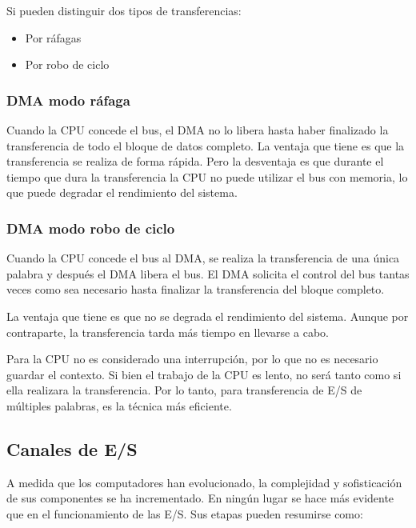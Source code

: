 Si pueden distinguir dos tipos de transferencias:

\begin{itemize}
  \item Por ráfagas
  \item Por robo de ciclo
\end{itemize}

\begin{subs}
  \subsubsection{DMA modo ráfaga}

  Cuando la CPU concede el bus, el DMA no lo libera hasta haber finalizado la transferencia de todo el bloque de datos completo. La ventaja que tiene es que la transferencia se realiza de forma rápida. Pero la desventaja es que durante el tiempo que dura la transferencia la CPU no puede utilizar el bus con memoria, lo que puede degradar el rendimiento del sistema.

  \subsubsection{DMA modo robo de ciclo}

  Cuando la CPU concede el bus al DMA, se realiza la transferencia de una única palabra y después el DMA libera el bus. El DMA solicita el control del bus tantas veces como sea necesario hasta finalizar la transferencia del bloque completo.

  La ventaja que tiene es que no se degrada el rendimiento del sistema. Aunque por contraparte, la transferencia tarda más tiempo en llevarse a cabo.

  Para la CPU no es considerado una interrupción, por lo que no es necesario guardar el contexto. Si bien el trabajo de la CPU es lento, no será tanto como si ella realizara la transferencia. Por lo tanto, para transferencia de E/S de múltiples palabras, es la técnica más eficiente.

\end{subs}

\subsection{Canales de E/S}

A medida que los computadores han evolucionado, la complejidad y sofisticación de sus componentes se ha incrementado. En ningún lugar se hace más evidente que en el funcionamiento de las E/S. Sus etapas pueden resumirse como:

